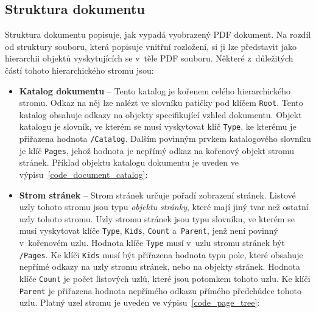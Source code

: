 \subsection*{Struktura dokumentu} \label{document_structure}
Struktura dokumentu popisuje, jak vypadá vyobrazený PDF dokument. Na rozdíl
od struktury souboru, která popisuje vnitřní rozložení, si ji
lze představit jako hierarchii objektů vyskytujících se v~těle PDF souboru.
Některé z~důležitých částí tohoto hierarchického stromu jsou:
\begin{itemize}
    \item \textbf{Katalog dokumentu} -- Tento katalog je kořenem celého
    hierarchického stromu. Odkaz na něj lze nalézt ve slovníku patičky pod klíčem
    \texttt{Root}. Tento katalog obsahuje odkazy na objekty specifikující vzhled
    dokumentu. Objekt katalogu je slovník, ve kterém se musí vyskytovat klíč
    \texttt{Type}, ke kterému je přiřazena hodnota \texttt{/Catalog}. Dalším
    povinným prvkem katalogového slovníku je klíč \texttt{Pages}, jehož hodnota je
    nepřímý odkaz na kořenový objekt stromu stránek. Příklad objektu katalogu
    dokumentu je uveden ve výpisu~\ref{code_document_catalog}:

    \item \textbf{Strom stránek} -- Strom stránek určuje pořadí zobrazení stránek.
    Listové uzly tohoto stromu jsou typu \emph{objektu stránky}, které mají jiný
    tvar než ostatní uzly tohoto stromu. Uzly stromu stránek jsou typu slovníku,
    ve kterém se musí vyskytovat klíče \texttt{Type}, \texttt{Kids},
    \texttt{Count} a~\texttt{Parent}, jenž není povinný v~kořenovém uzlu.
    Hodnota klíče \texttt{Type} musí v~uzlu stromu stránek být \texttt{/Pages}.
    Ke klíči \texttt{Kids} musí být přiřazena hodnota typu pole, které obsahuje
    nepřímé odkazy na uzly stromu stránek, nebo na objekty stránek. Hodnota klíče
    \texttt{Count} je počet listových uzlů, které jsou potomkem tohoto uzlu. Ke
    klíči \texttt{Parent} je přiřazena hodnota nepřímého odkazu přímého předchůdce
    tohoto uzlu. Platný uzel stromu je uveden ve výpisu~\ref{code_page_tree}:


\end{itemize}
